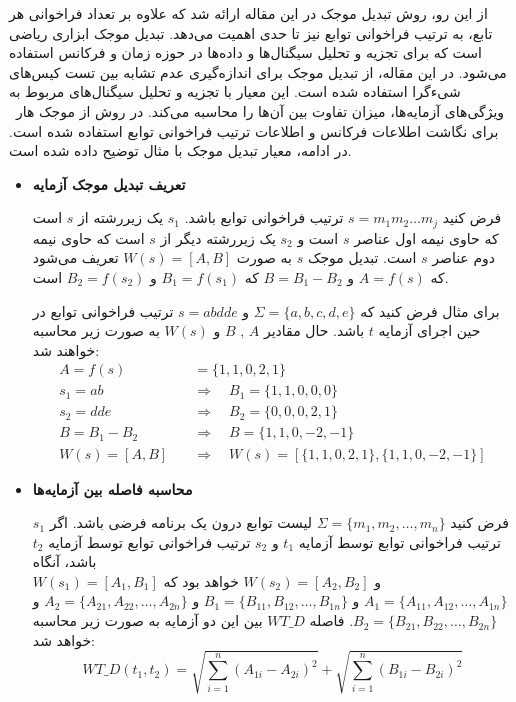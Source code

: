 از این رو، روش تبدیل موجک در این مقاله ارائه شد که علاوه بر تعداد فراخوانی هر تابع، به ترتیب فراخوانی توابع نیز تا حدی اهمیت می‌دهد. تبدیل موجک ابزاری ریاضی است که برای تجزیه و تحلیل سیگنال‌ها و داده‌ها در حوزه زمان و فرکانس استفاده می‌شود\cite{stankovic2005haar}\cite{egiazarian2002tree}\cite{kulkarni2011wavelet}. در این مقاله\cite{chen2021novel}، از تبدیل موجک برای اندازه‌گیری عدم تشابه بین تست‌ کیس‌های شیءگرا استفاده شده است. این معیار با تجزیه و تحلیل سیگنال‌های مربوط به ویژگی‌های آزمایه‌ها، میزان تفاوت بین آن‌ها را محاسبه می‌کند. در روش
 از موجک هار~\cite{stankovic2005haar} برای نگاشت اطلاعات فرکانس و اطلاعات ترتیب فراخوانی توابع استفاده شده است. در ادامه، معیار تبدیل موجک با مثال توضیح داده شده است.

\begin{itemize}
	\item \textbf{تعریف تبدیل موجک آزمایه}
	
فرض کنید \(s = m_1 m_2 \dots m_j\) ترتیب فراخوانی توابع باشد. \(s_1\) یک زیررشته از \(s\) است که حاوی نیمه اول عناصر \(s\) است و \(s_2\) یک زیررشته دیگر از \(s\) است که حاوی نیمه دوم عناصر \(s\) است. تبدیل موجک \(s\) به صورت \(W(s) = [A, B]\) تعریف می‌شود که \(A = f(s)\) و \(B = B_1 - B_2\) که \(B_1 = f(s_1)\) و \(B_2 = f(s_2)\) است.

برای مثال فرض کنید که \(\Sigma = \{a, b, c, d, e\}\) و \(s = abdde\) ترتیب فراخوانی توابع در حین اجرای آزمایه \(t\) باشد. حال مقادیر \(A\) , \(B\) و \(W(s)\) به صورت زیر محاسبه خواهند شد:
\begin{align*}
	A = f(s) &= \{1, 1, 0, 2, 1\} \\
	s_1 = ab \quad & \Rightarrow \quad B_1 = \{1, 1, 0, 0, 0\} \\
	s_2 = dde \quad &\Rightarrow \quad B_2 = \{0, 0, 0, 2, 1\} \\
	B = B_1 - B_2 \quad &\Rightarrow \quad B = \{1, 1, 0, -2, -1\} \\
	W(s) = [A, B] \quad &\Rightarrow \quad W(s) = \left[\{1, 1, 0, 2, 1\}, \{1, 1, 0, -2, -1\}\right]
\end{align*}

\item \textbf{محاسبه فاصله بین آزمایه‌‌ها}

فرض کنید \(\Sigma = \{m_1, m_2, \dots, m_n\}\) لیست توابع درون یک برنامه فرضی باشد. اگر \(s_1\) ترتیب فراخوانی توابع توسط آزمایه \(t_1\) و \(s_2\) ترتیب فراخوانی توابع توسط آزمایه \(t_2\) باشد، آنگاه\\ \(W(s_1) = [A_1, B_1]\) و \(W(s_2) = [A_2, B_2]\) خواهد بود که \(A_1 = \{A_{11}, A_{12}, \dots, A_{1n}\}\) و \(B_1 = \{B_{11}, B_{12}, \dots, B_{1n}\}\) و \(A_2 = \{A_{21}, A_{22}, \dots, A_{2n}\}\) و \(B_2 = \{B_{21}, B_{22}, \dots, B_{2n}\}\). فاصله \(WT\_D\) بین این دو آزمایه به صورت زیر محاسبه خواهد شد:
\[
WT\_D(t_1, t_2) = \sqrt{\sum_{i=1}^{n} (A_{1i} - A_{2i})^2} + \sqrt{\sum_{i=1}^{n} (B_{1i} - B_{2i})^2}
\]


\end{itemize}

